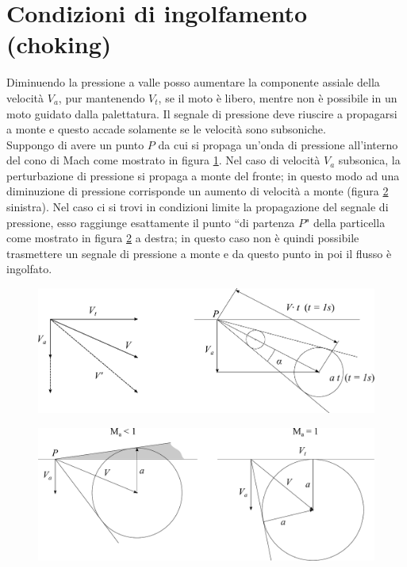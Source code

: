 \section{Condizioni di ingolfamento (choking)}
Diminuendo la pressione a valle posso aumentare la componente assiale della velocità $V_a$, pur mantenendo $V_t$, se il moto è libero, mentre non è possibile in un moto guidato dalla palettatura. Il segnale di pressione deve riuscire a propagarsi a monte e questo accade solamente se le velocità sono subsoniche.\\
Suppongo di avere un punto $P$ da cui si propaga un'onda di pressione all'interno del cono di Mach come mostrato in figura \ref{fd:bloccson1}. Nel caso di velocità $V_a$ subsonica, la perturbazione di pressione si propaga a monte del fronte; in questo modo ad una diminuzione di pressione corrisponde un aumento di velocità a monte (figura \ref{fd:bloccson2} sinistra). Nel caso ci si trovi in condizioni limite la propagazione del segnale di pressione, esso raggiunge esattamente il punto ``di partenza $P$" della particella come mostrato in figura \ref{fd:bloccson2} a destra; in questo caso non è quindi possibile trasmettere un segnale di pressione a monte e da questo punto in poi il flusso è ingolfato. 
\begin{figure}
\centering
  \includegraphics[width=.8\textwidth]{fig/bloccson1.pdf}
\caption{}
\label{fd:bloccson1}
\end{figure}
\begin{figure}
\centering
  \includegraphics[width=.8\textwidth]{fig/bloccson2.pdf}
\caption{}
\label{fd:bloccson2}
\end{figure}
